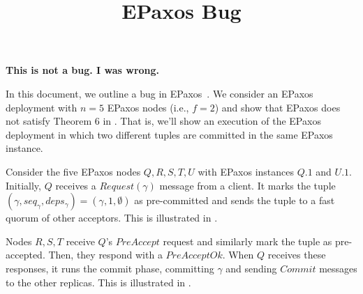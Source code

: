 \documentclass{mwhittaker}
\title{EPaxos Bug}
\newcommand{\instance}[7][top]{{%
  \ifthenelse{\NOT \(
    \equal{#6}{} \OR
    \equal{#6}{pre-accepted} \OR
    \equal{#6}{accepted} \OR
    \equal{#6}{committed}
  \)}{%
    \errmessage{Instance status must be pre-accepted, accepted, or committed.}
  }{}

  \newcommand{\instancecolor}{black}
  \newcommand{\abbreviatedstatus}{}
  \ifthenelse{\equal{#6}{pre-accepted}}{%
    \renewcommand{\instancecolor}{flatblue}
    \renewcommand{\abbreviatedstatus}{pre}
  }{\ifthenelse{\equal{#6}{accepted}}{%
    \renewcommand{\instancecolor}{flatred}
    \renewcommand{\abbreviatedstatus}{acc}
  }{\ifthenelse{\equal{#6}{committed}}{%
    \renewcommand{\instancecolor}{flatgreen}
    \renewcommand{\abbreviatedstatus}{com}
  }{%
  }}}

  \ifthenelse{\equal{#1}{top}}{%
    \newcommand{\instancelabel}{90}
  }{\ifthenelse{\equal{#1}{bottom}}{%
    \newcommand{\instancelabel}{270}
  }{%
    \errmessage{The optional instance argument must be top or bottom, not #1.}
  }}

  \node[
    draw=\instancecolor,
    line width=1pt,
    label={\instancelabel:$#3$},
    minimum height=1.5cm,
    minimum width=1.5cm,
    align=center
  ] (#2) at (#7) {\abbreviatedstatus{}\\$#4$\\$#5$};%
}}
\newcommand{\Qx}{0}
\newcommand{\Rx}{2}
\newcommand{\Sx}{4}
\newcommand{\Tx}{6}
\newcommand{\Ux}{8}
\begin{document}
\maketitle

\begin{center}
  \textbf{This is not a bug. I was wrong.}
\end{center}

In this document, we outline a bug in EPaxos~\cite{moraru2013there,
moraru2013proof}. We consider an EPaxos deployment with $n = 5$ EPaxos nodes
(i.e., $f = 2$) and show that EPaxos does not satisfy Theorem $6$ in
\cite{moraru2013proof}. That is, we'll show an execution of the EPaxos
deployment in which two different tuples are committed in the same EPaxos
instance.

Consider the five EPaxos nodes $Q, R, S, T, U$ with EPaxos instances $Q.1$ and
$U.1$. Initially, $Q$ receives a $Request(\gamma)$ message from a client. It
marks the tuple $(\gamma, seq_\gamma, deps_\gamma) = (\gamma, 1, \emptyset)$ as
pre-committed and sends the tuple to a fast quorum of other acceptors. This is
illustrated in .

\begin{figure}[h]
  \centering


  \caption{}
\end{figure}

Nodes $R, S, T$ receive $Q$'s $PreAccept$ request and similarly mark the tuple
as pre-accepted. Then, they respond with a $PreAcceptOk$. When $Q$ receives
these responses, it runs the commit phase, committing $\gamma$ and sending
$Commit$ messages to the other replicas. This is illustrated in
.
\end{document}
